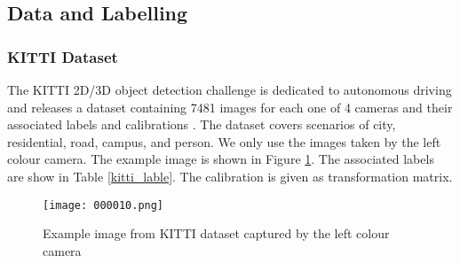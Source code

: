 \subsection{Data and Labelling}
\label{data}
\subsubsection{KITTI Dataset}
The KITTI 2D/3D object detection challenge is dedicated to autonomous driving and releases a dataset containing 7481 images for each one of 4 cameras and their associated labels and calibrations \cite{Geiger2012CVPR}. The dataset covers scenarios of city, residential, road, campus, and person. We only use the images taken by the left colour camera. The example image is shown in Figure \ref{figure:kitti_image}. The associated labels are show in Table \ref{kitti_lable}. The calibration is given as transformation matrix.

\begin{figure}[h]		
	\texttt{[image: 000010.png]}
	\caption{Example image from KITTI dataset captured by the left colour camera}
	\centering
	\label{figure:kitti_image}
\end{figure}


